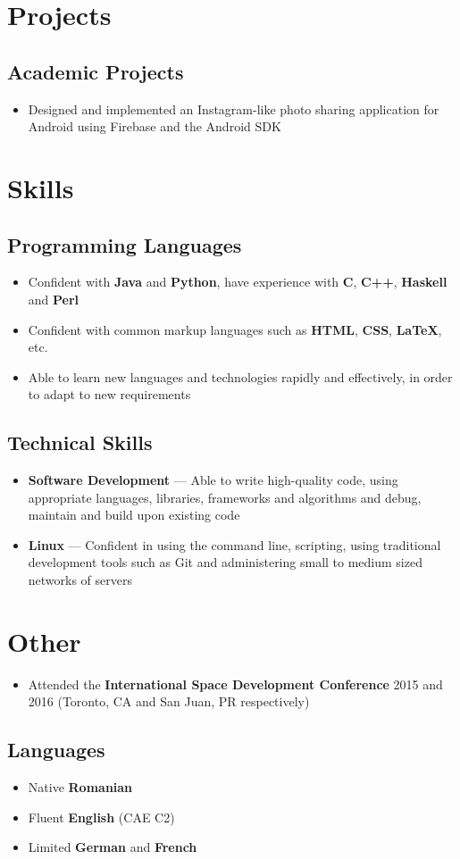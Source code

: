 \documentclass[a4paper]{article}
\begin{document}
\section*{Projects}

\subsection*{Academic Projects}
\begin{itemize}
	\item Designed and implemented an Instagram-like photo sharing application
		for Android using Firebase and the Android SDK
\end{itemize}

\section*{Skills}

\subsection*{Programming Languages}
\begin{itemize}
	\item Confident with \textbf{Java} and \textbf{Python}, have experience with \textbf{C},
		\textbf{C++}, \textbf{Haskell} and \textbf{Perl}
	\item Confident with common markup languages such as \textbf{HTML},
		\textbf{CSS}, \textbf{{\LaTeX}}, etc.
	\item Able to learn new languages and technologies rapidly and effectively,
		in order to adapt to new requirements
\end{itemize}

\subsection*{Technical Skills}
\begin{itemize}
	\item \textbf{Software Development} --- Able to write high-quality code, using
		appropriate languages, libraries, frameworks and algorithms and debug,
		maintain and build upon existing code
	\item \textbf{Linux} --- Confident in using the command line, scripting, using
		traditional development tools such as Git and administering small to
		medium sized networks of servers
\end{itemize}

\section*{Other}
\begin{itemize}
	\item Attended the \textbf{International Space Development Conference} 2015
		and 2016 (Toronto, CA and San Juan, PR respectively)
\end{itemize}

\subsection*{Languages}
\begin{itemize}
	\item Native \textbf{Romanian}
	\item Fluent \textbf{English} (CAE C2)
	\item Limited \textbf{German} and \textbf{French}
\end{itemize}
\end{document}
